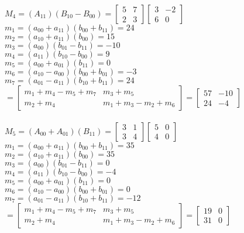 \documentclass[letterpaper,10pt]{article}
\begin{document}
\begin{flushleft}
$M_4=(A_{11})(B_{10}-B_{00})=
\left[ 
	\begin{array}{cc}
		5 & 7\\
		2 & 3 
	\end{array} 
\right]
\left[ 
	\begin{array}{cc}
		3 & -2\\
		6 & 0 
	\end{array} 
\right]$\\
	$m_1=(a_{00}+a_{11})(b_{00}+b_{11})=24$\\
	$m_2=(a_{10}+a_{11})(b_{00})=15$\\
	$m_3=(a_{00})(b_{01}-b_{11})=-10$\\
	$m_4=(a_{11})(b_{10}-b_{00})=9$\\
	$m_5=(a_{00}+a_{01})(b_{11})=0$\\
	$m_6=(a_{10}-a_{00})(b_{00}+b_{01})=-3$\\
	$m_7=(a_{01}-a_{11})(b_{10}+b_{11})=24$\\
$=
\left[ 
	\begin{array}{cc}
		m_1+m_4-m_5+m_7 & m_3+m_5\\
		m_2+m_4 & m_1+m_3-m_2+m_6 
	\end{array} 
\right]	=
	\left[ 
		\begin{array}{cc}
			57 & -10\\
			24 & -4 
		\end{array} 
	\right]$\\
~\\

$M_5=(A_{00}+A_{01})(B_{11})=
\left[ 
	\begin{array}{cc}
		3 & 1\\
		3 & 4 
	\end{array} 
\right]
\left[ 
	\begin{array}{cc}
		5 & 0\\
		4 & 0 
	\end{array} 
\right]$\\
	$m_1=(a_{00}+a_{11})(b_{00}+b_{11})=35$\\
	$m_2=(a_{10}+a_{11})(b_{00})=35$\\
	$m_3=(a_{00})(b_{01}-b_{11})=0$\\
	$m_4=(a_{11})(b_{10}-b_{00})=-4$\\
	$m_5=(a_{00}+a_{01})(b_{11})=0$\\
	$m_6=(a_{10}-a_{00})(b_{00}+b_{01})=0$\\
	$m_7=(a_{01}-a_{11})(b_{10}+b_{11})=-12$\\
$=
\left[ 
	\begin{array}{cc}
		m_1+m_4-m_5+m_7 & m_3+m_5\\
		m_2+m_4 & m_1+m_3-m_2+m_6 
	\end{array} 
\right]	=
	\left[ 
		\begin{array}{cc}
			19 & 0\\
			31 & 0 
		\end{array} 
	\right]$\\
~\\


\end{flushleft}
\end{document}
